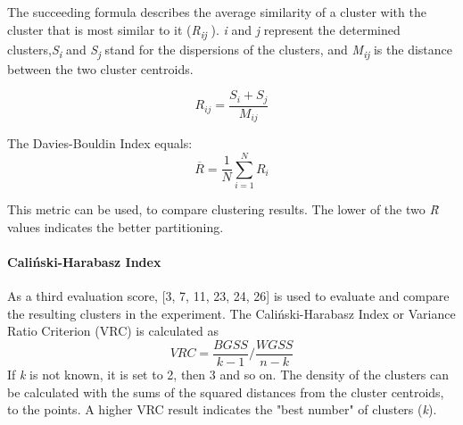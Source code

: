 The succeeding formula describes the average similarity of a cluster with the cluster that is most similar to it (\textit{R\textsubscript{ij}} ).
\textit{i} and \textit{j} represent the determined clusters,\textit{S\textsubscript{i}} and \textit{S\textsubscript{j}} stand for the dispersions of the clusters, and \textit{M\textsubscript{ij}} is the distance between the two cluster centroids. 

\[
  R_{ij} = \frac{S_i + S_j}{M_{ij}}  
\]

The Davies-Bouldin Index equals:
\[
\overline{R} = \frac{1}{N}\sum_{i=1}^{N}R_i
\]

This metric can be used, to compare clustering results. The lower of the two \textit{\=R} values indicates the better partitioning.

\paragraph{Caliński-Harabasz Index}
As a third evaluation score, \textcite{calinskiHarabasz}[3, 7, 11, 23, 24, 26] is used to evaluate and compare the resulting clusters in the experiment. 
The Caliński-Harabasz Index or Variance Ratio Criterion (VRC) is calculated as 
\[
VRC = \frac{BGSS}{k-1}/\frac{WGSS}{n-k}
\]
If \textit{k} is not known, it is set to 2, then 3 and so on. The density of the clusters can be calculated with the sums of the squared distances from the cluster centroids, to the points. A higher VRC result indicates the "best number" of clusters (\textit{k}).




